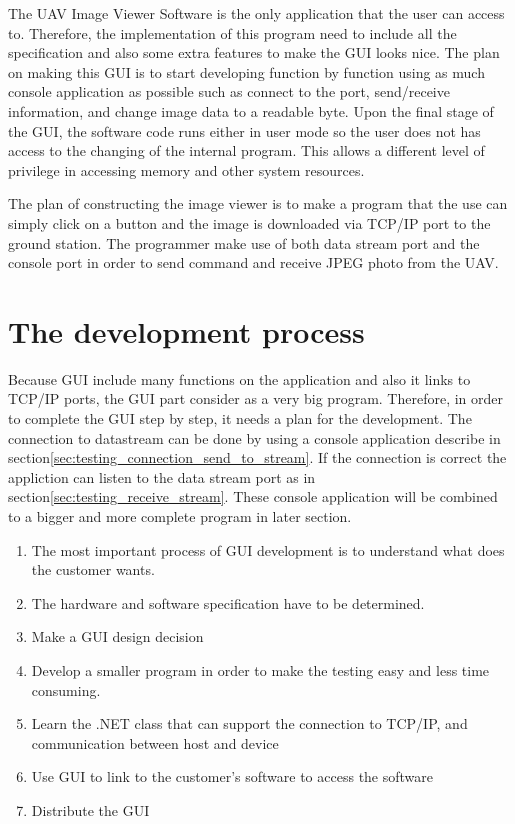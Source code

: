 \label{chap:implementation_ground_station }

The UAV Image Viewer Software is the only application that the user can access to. 
Therefore, the implementation of this program need to include all the specification and also some extra features to make the GUI looks nice.
The plan on making this GUI is to start developing function by function using as much console application as possible such as connect to the port, send/receive information, and change image data to a readable byte.
Upon the final stage of the GUI, the software code runs either in user mode so the user does not has access to the changing of the internal program\cite{tsuiK}. 
This allows a different level of privilege in accessing memory and other system resources. 

The plan of constructing the image viewer is to make a program that the use can simply click on a button and the image is downloaded via TCP/IP port to the ground station.
The programmer make use of both data stream port and the console port in order to send command and receive JPEG photo from the UAV.

\section{The development process} 
Because GUI include many functions on the application and also it links to TCP/IP ports, the GUI part consider as a very big program. 
Therefore, in order to complete the GUI step by step, it needs a plan for the development.
The connection to datastream can be done by using a console application describe in section\ref{sec:testing_connection_send_to_stream}.
If the connection is correct the appliction can listen to the data stream port as in section\ref{sec:testing_receive_stream}.
These console application will be combined to a bigger and more complete program in later section.

\flushleft
\begin{enumerate}


\item	The most important process of GUI development is to understand what does the customer wants. 

\item	The hardware and software specification have to be determined.
 
\item	Make a GUI design decision

\item Develop a smaller program in order to make the testing easy and less time consuming. 

\item	Learn the .NET class that can support the connection to TCP/IP, and communication between host and device

\item	Use GUI to link to the customer’s software to access the software

\item	Distribute the GUI
\end{enumerate}

